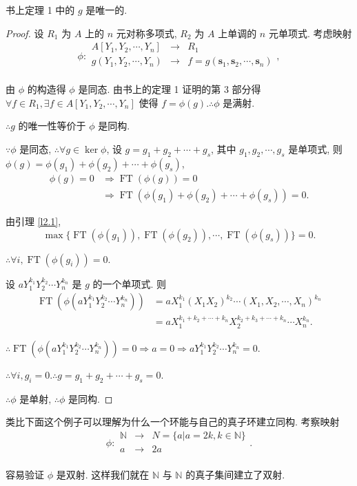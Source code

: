 \documentclass[UTF8]{ctexart}
\begin{document}
\begin{theorem}
    书上定理 1 中的 $g$ 是唯一的.
\end{theorem}
\begin{proof}
    设 $R_1$ 为 $A$ 上的 $n$ 元对称多项式, $R_2$ 为 $A$ 上单调的 $n$ 元单项式. 考虑映射
    \[\phi:\begin{array}{rcl}
        A[Y_1,Y_2,\cdots,Y_n] & \to & R_1 \\
        g(Y_1,Y_2,\cdots,Y_n) & \to & f=g(\mathbf{s}_1,\mathbf{s}_2,\cdots,\mathbf{s}_n) \\
    \end{array},\]

    由 $\phi$ 的构造得 $\phi$ 是同态. 由书上的定理 1 证明的第 3 部分得 $\forall f\in R_1,\exists f\in A[Y_1,Y_2,\cdots,Y_n]$ 使得 $f=\phi(g).\therefore\phi$ 是满射.
    
    $\therefore g$ 的唯一性等价于 $\phi$ 是同构.
    
    $\because\phi$ 是同态, $\therefore\forall g\in\ker\phi$, 设 $g=g_1+g_2+\cdots+g_s$, 其中 $g_1,g_2,\cdots,g_s$ 是单项式, 则 $\phi(g)=\phi(g_1)+\phi(g_2)+\cdots+\phi(g_s)$,
    \begin{align*}
        \phi(g)=0 & \Rightarrow\operatorname{FT}(\phi(g))=0 \\
        & \Rightarrow\operatorname{FT}(\phi(g_1)+\phi(g_2)+\cdots+\phi(g_s))=0.
    \end{align*}

    由引理 \ref{l2.1},
    \[\max\{\operatorname{FT}(\phi(g_1)),\operatorname{FT}(\phi(g_2)),\cdots,\operatorname{FT}(\phi(g_s))\}=0.\]

    $\therefore\forall i,\operatorname{FT}(\phi(g_i))=0$.

    设 $aY^{k_1}_1Y^{k_2}_2\cdots Y^{k_n}_n$ 是 $g$ 的一个单项式. 则
    \begin{align*}
        \operatorname{FT}(\phi(aY^{k_1}_1Y^{k_2}_2\cdots Y^{k_n}_n)) & =aX_1^{k_1}(X_1X_2)^{k_2}\cdots(X_1,X_2,\cdots,X_n)^{k_n} \\
        & =aX_1^{k_1+k_2+\cdots+k_n}X_2^{k_2+k_3+\cdots+k_n}\cdots X_n^{k_n}.
    \end{align*}

    $\therefore\operatorname{FT}(\phi(aY^{k_1}_1Y^{k_2}_2\cdots Y^{k_n}_n))=0\Rightarrow a=0\Rightarrow aY^{k_1}_1Y^{k_2}_2\cdots Y^{k_n}_n=0$.

    $\therefore\forall i,g_i=0.\therefore g=g_1+g_2+\cdots+g_s=0$.

    $\therefore\phi$ 是单射, $\therefore\phi$ 是同构.
\end{proof}
\begin{note}
    类比下面这个例子可以理解为什么一个环能与自己的真子环建立同构. 考察映射
    \[\phi:\begin{array}{rcl}
        \mathbb{N} & \to & N=\{a|a=2k,k\in\mathbb{N}\} \\
        a & \to & 2a \\
    \end{array}.\]

    容易验证 $\phi$ 是双射. 这样我们就在 $\mathbb{N}$ 与 $\mathbb{N}$ 的真子集间建立了双射.
\end{note}
\end{document}
